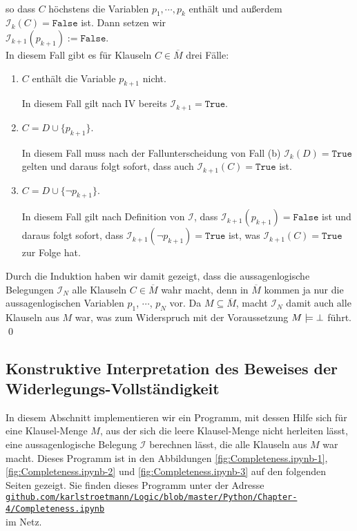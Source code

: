 \begin{enumerate}
\begin{enumerate}
    \\[0.2cm]
    so dass $C$ höchstens die Variablen $p_1,\cdots,p_k$ enthält und außerdem $\mathcal{I}_k(C) = \mathtt{False}$
    ist.  Dann setzen wir
    \\[0.2cm]
    \hspace*{1.3cm}
    $\mathcal{I}_{k+1}(p_{k+1}) := \mathtt{False}$.
    \\[0.2cm]    
    In diesem Fall gibt es für Klauseln $C \in \overline{M}$ drei Fälle:
    \begin{enumerate}[1.]
    \item $C$ enthält die Variable $p_{k+1}$ nicht.
      
          In diesem Fall gilt nach IV bereits $\mathcal{I}_{k+1} = \mathtt{True}$.        
    \item $C = D \cup \{ p_{k+1} \}$.

          In diesem Fall muss nach der Fallunterscheidung von Fall (b) $\mathcal{I}_k(D) = \mathtt{True}$
          gelten und daraus folgt sofort, dass auch $\mathcal{I}_{k+1}(C) = \mathtt{True}$ ist.
    \item $C = D \cup \{ \neg p_{k+1} \}$.

          In diesem Fall gilt nach Definition von $\mathcal{I}$, dass $\mathcal{I}_{k+1}(p_{k+1}) = \mathtt{False}$
          ist und daraus folgt sofort, dass $\mathcal{I}_{k+1}(\neg p_{k+1}) = \mathtt{True}$ ist, was
          $\mathcal{I}_{k+1}(C) = \mathtt{True}$ zur Folge hat.
    \end{enumerate}
    Durch die Induktion haben wir damit gezeigt, dass die aussagenlogische Belegungen
    $\mathcal{I}_{N}$ alle Klauseln $C \in \overline{M}$ wahr macht, denn in $\overline{M}$ kommen ja nur die
    aussagenlogischen Variablen $p_1$, $\cdots$, $p_N$ vor.
    Da $M \subseteq \overline{M}$, macht $\mathcal{I}_{N}$ damit auch alle Klauseln aus $M$ war, was zum
    Widerspruch mit der Voraussetzung $M \models \bot$ führt. \qed
  \end{enumerate}
\end{enumerate}

\subsection{Konstruktive Interpretation des Beweises der Widerlegungs-Vollständigkeit}
In diesem Abschnitt implementieren wir ein Programm, mit dessen Hilfe sich für eine Klausel-Menge $M$, aus der
sich die leere Klausel-Menge nicht herleiten lässt, eine aussagenlogische Belegung $\mathcal{I}$ berechnen
lässt, die alle Klauseln aus $M$ war macht.  Dieses Programm ist in den 
Abbildungen \ref{fig:Completeness.ipynb-1}, \ref{fig:Completeness.ipynb-2} und
\ref{fig:Completeness.ipynb-3} auf den folgenden Seiten gezeigt.  Sie finden dieses Programm unter der Adresse
\\[0.2cm]
\hspace*{0.8cm}
\href{https://github.com/karlstroetmann/Logic/blob/master/Python/Chapter-4/Completeness.ipynb}{\texttt{github.com/karlstroetmann/Logic/blob/master/Python/Chapter-4/Completeness.ipynb}}
\\[0.2cm]
im Netz.

